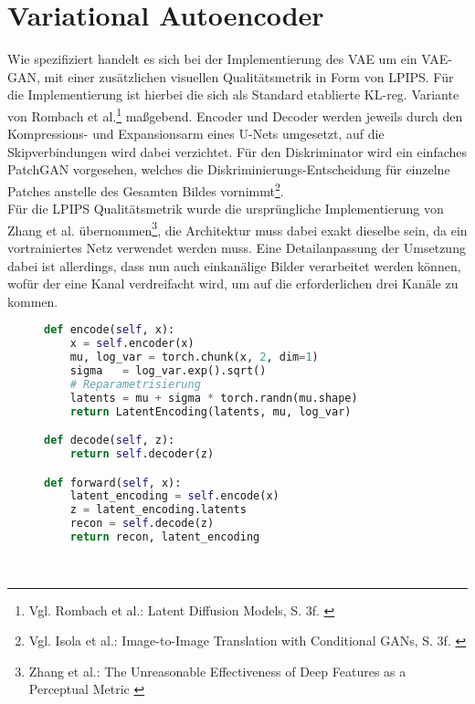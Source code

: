 \section {Variational Autoencoder}

Wie spezifiziert handelt es sich bei der Implementierung des \ac{VAE} um ein VAE-GAN, mit einer zusätzlichen visuellen Qualitätsmetrik in Form von \ac{LPIPS}. Für die Implementierung ist hierbei die sich als Standard etablierte KL-reg. Variante von Rombach et al.\footnote{
    Vgl. Rombach et al.: Latent Diffusion Models, S. 3f.
    \cite{rombach2022high}
} maßgebend. Encoder und Decoder werden jeweils durch den Kompressions- und Expansionsarm eines U-Nets umgesetzt, auf die Skipverbindungen wird dabei verzichtet. Für den Diskriminator wird ein einfaches PatchGAN vorgesehen, welches die Diskriminierungs-Entscheidung für einzelne Patches anstelle des Gesamten Bildes vornimmt\footnote{
    Vgl. Isola et al.: Image-to-Image Translation with Conditional GANs, S. 3f.
    \cite{isola2018imagetoimagetranslationconditionaladversarial}
}. \\
Für die \ac{LPIPS} Qualitätsmetrik wurde die ursprüngliche Implementierung von Zhang et al. übernommen\footnote{
    Zhang et al.: The Unreasonable Effectiveness of Deep Features as a Perceptual Metric
    \cite{zhang2018unreasonableeffectivenessdeepfeatures}
}, die Architektur muss dabei exakt dieselbe sein, da ein vortrainiertes Netz verwendet werden muss. Eine Detailanpassung der Umsetzung dabei ist allerdings, dass nun auch einkanälige Bilder verarbeitet werden können, wofür der eine Kanal verdreifacht wird, um auf die erforderlichen drei Kanäle zu kommen.
\begin{figure}[htbp]
\begin{lstlisting}[language=python]
def encode(self, x):
    x = self.encoder(x)
    mu, log_var = torch.chunk(x, 2, dim=1) 
    sigma   = log_var.exp().sqrt()
    # Reparametrisierung
    latents = mu + sigma * torch.randn(mu.shape)
    return LatentEncoding(latents, mu, log_var)

def decode(self, z):
    return self.decoder(z)

def forward(self, x):
    latent_encoding = self.encode(x) 
    z = latent_encoding.latents
    recon = self.decode(z)
    return recon, latent_encoding
\end{lstlisting}
    \captionsetup{type=figure}
    \label{fig:vae_forward}
\end{figure} \\
